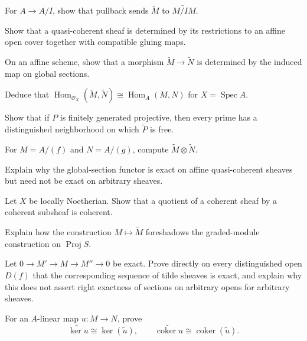 \begin{exercise}For $A\to A/I$, show that pullback sends $\widetilde M$ to $\widetilde{M/IM}$.\end{exercise}
\begin{exercise}Show that a quasi-coherent sheaf is determined by its restrictions to an affine open cover together with compatible gluing maps.\end{exercise}
\begin{exercise}On an affine scheme, show that a morphism $\widetilde M\to\widetilde N$ is determined by the induced map on global sections.\end{exercise}
\begin{exercise}Deduce that $\operatorname{Hom}_{\mathcal O_X}(\widetilde M,\widetilde N)\cong\operatorname{Hom}_A(M,N)$ for $X=\operatorname{Spec}A$.\end{exercise}
\begin{exercise}Show that if $P$ is finitely generated projective, then every prime has a distinguished neighborhood on which $\widetilde P$ is free.\end{exercise}
\begin{exercise}For $M=A/(f)$ and $N=A/(g)$, compute $\widetilde M\otimes\widetilde N$.\end{exercise}
\begin{exercise}Explain why the global-section functor is exact on affine quasi-coherent sheaves but need not be exact on arbitrary sheaves.\end{exercise}
\begin{exercise}Let $X$ be locally Noetherian.  Show that a quotient of a coherent sheaf by a coherent subsheaf is coherent.\end{exercise}
\begin{exercise}Explain how the construction $M\mapsto\widetilde M$ foreshadows the graded-module construction on $\operatorname{Proj}S$.\end{exercise}
\begin{exercise}Let $0\to M'\to M\to M''\to0$ be exact.  Prove directly on every distinguished open $D(f)$ that the corresponding sequence of tilde sheaves is exact, and explain why this does not assert right exactness of sections on arbitrary opens for arbitrary sheaves.\end{exercise}
\begin{exercise}For an $A$-linear map $u:M\to N$, prove
\[
\widetilde{\ker u}\cong\ker(\widetilde u),
\qquad
\widetilde{\operatorname{coker}u}\cong\operatorname{coker}(\widetilde u).
\]
\end{exercise}

